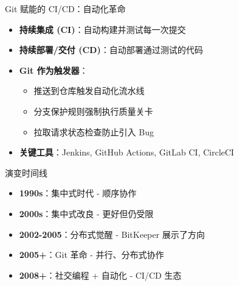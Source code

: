 \documentclass{beamer}
\begin{document}
\begin{frame}[t]{Git 赋能的 CI/CD：自动化革命}
\begin{itemize}
    \item \textbf{持续集成 (CI)}：自动构建并测试每一次提交
    \item \textbf{持续部署/交付 (CD)}：自动部署通过测试的代码
    \item \textbf{Git 作为触发器}： 
        \begin{itemize}
            \item 推送到仓库触发自动化流水线
            \item 分支保护规则强制执行质量关卡
            \item 拉取请求状态检查防止引入 Bug
        \end{itemize}
    \item \textbf{关键工具}：Jenkins, GitHub Actions, GitLab CI, CircleCI
\end{itemize}
\end{frame}

\begin{frame}[t]{演变时间线}
\begin{center}
\end{center}

\begin{itemize}
    \item \textbf{1990s}：集中式时代 - 顺序协作
    \item \textbf{2000s}：集中式改良 - 更好但仍受限
    \item \textbf{2002-2005}：分布式觉醒 - BitKeeper 展示了方向
    \item \textbf{2005+}：Git 革命 - 并行、分布式协作
    \item \textbf{2008+}：社交编程 + 自动化 - CI/CD 生态
\end{itemize}
\end{frame}
\end{document}
